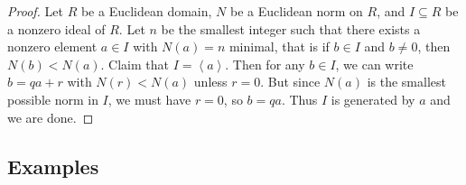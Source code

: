 \documentclass{article}
\newcommand{\rb}[1]{\left( #1 \right)}
\newcommand{\ab}[1]{\left\langle #1 \right\rangle}
\theoremstyle{definition}\newtheorem{definition}{Definition}[section]
\theoremstyle{definition}\newtheorem{remark}[definition]{Remark}
\theoremstyle{definition}\newtheorem*{example}{Example}
\theoremstyle{definition}\newtheorem*{note}{Note}
\begin{document}
\begin{proof}
Let $ R $ be a Euclidean domain, $ N $ be a Euclidean norm on $ R $, and $ I \subseteq R $ be a nonzero ideal of $ R $. Let $ n $ be the smallest integer such that there exists a nonzero element $ a \in I $ with $ N\rb{a} = n $ minimal, that is if $ b \in I $ and $ b \ne 0 $, then $ N\rb{b} < N\rb{a} $. Claim that $ I = \ab{a} $. Then for any $ b \in I $, we can write $ b = qa + r $ with $ N\rb{r} < N\rb{a} $ unless $ r = 0 $. But since $ N\rb{a} $ is the smallest possible norm in $ I $, we must have $ r = 0 $, so $ b = qa $. Thus $ I $ is generated by $ a $ and we are done.
\end{proof}

\subsection{Examples}
\end{document}
